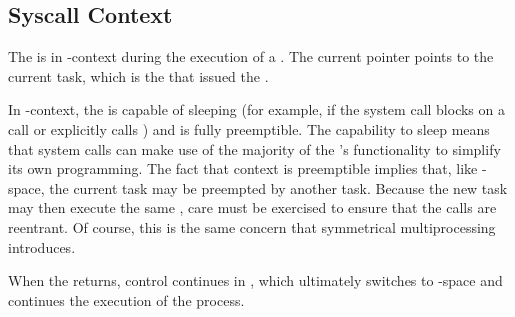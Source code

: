 \subsection{Syscall Context}\label{subsec:Syscall_Context}
The  is in -context during the execution of a .
The current pointer points to the current task, which is the  that issued the .

In -context, the  is capable of sleeping (for example, if the system call blocks on a call or explicitly calls ) and is fully preemptible.
The capability to sleep means that system calls can make use of the majority of the ’s functionality to simplify its own programming.
The fact that  context is preemptible implies that, like -space, the current task may be preempted by another task.
Because the new task may then execute the same , care must be exercised to ensure that the calls are reentrant.
Of course, this is the same concern that symmetrical multiprocessing introduces.

When the  returns, control continues in , which ultimately switches to -space and continues the execution of the  process.

